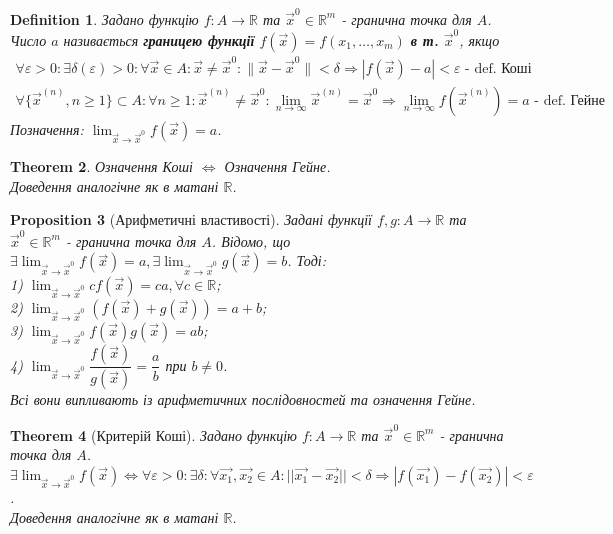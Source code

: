 \documentclass[a4paper, 10pt]{article}
\def\huge{\displaystyle}
\theoremstyle{theoremdd}
\newtheorem{theorem}{Theorem}[subsection]
\theoremstyle{theoremdd}
\newtheorem{definition}[theorem]{Definition}
\theoremstyle{theoremdd}
\theoremstyle{theoremdd}
\theoremstyle{theoremdd}
\newtheorem{proposition}[theorem]{Proposition}
\theoremstyle{theoremdd}
\theoremstyle{theoremdd}
\theoremstyle{theoremdd}
\newcommand\Norm[1]{\lVert#1\rVert}
\begin{document}
\begin{definition}
Задано функцію $f: A \to \mathbb{R}$ та $\vec{x}^0 \in \mathbb{R}^m$ - гранична точка для $A$.\\
Число $a$ називається \textbf{границею функції} $f(\vec{x}) = f(x_1,\dots,x_m)$ \textbf{в т.} $\vec{x}^0$, якщо
\begin{align*}
\forall \varepsilon > 0: \exists \delta(\varepsilon) > 0: \forall \vec{x} \in A: \vec{x} \neq \vec{x}^0: \Norm{\vec{x} - \vec{x}^0} < \delta \Rightarrow |f(\vec{x}) - a| < \varepsilon \textrm{ - def. Коші}\\
\forall \{\vec{x}^{(n)}, n \geq 1\} \subset A: \forall n \geq 1: \vec{x}^{(n)} \neq \vec{x}^0: \huge \lim_{n \to \infty} \vec{x}^{(n)} = \vec{x}^0 \Rightarrow \lim_{n \to \infty} f(\vec{x}^{(n)}) = a \textrm{ - def. Гейне}
\end{align*}
Позначення: $\huge \lim_{\vec{x} \to \vec{x}^0} f(\vec{x}) = a$.
\end{definition}

\begin{theorem}
Означення Коші $\iff$ Означення Гейне.\\
\textit{Доведення аналогічне як в матані $\mathbb{R}$.}
\end{theorem}

\begin{proposition}[Арифметичні властивості]
Задані функції $f,g: A \to \mathbb{R}$ та $\vec{x}^0 \in \mathbb{R}^m$ - гранична точка для $A$. Відомо, що \\ $\exists \huge \lim_{\vec{x} \to \vec{x}^0} f(\vec{x}) = a, \exists \lim_{\vec{x} \to \vec{x}^0} g(\vec{x}) = b$. Тоді:\\
1) $\huge \lim_{\vec{x} \to \vec{x}^0} cf(\vec{x}) = ca, \forall c \in \mathbb{R}$;\\
2) $\huge \lim_{\vec{x} \to \vec{x}^0} (f(\vec{x}) + g(\vec{x})) = a + b$;\\
3) $\huge \lim_{\vec{x} \to \vec{x}^0} f(\vec{x})g(\vec{x}) = ab$;\\
4) $\huge \lim_{\vec{x} \to \vec{x}^0} \dfrac{f(\vec{x})}{g(\vec{x})} = \dfrac{a}{b}$ при $b \neq 0$.\\
\textit{Всі вони випливають із арифметичних послідовностей та означення Гейне.}
\end{proposition}

\begin{theorem}[Критерій Коші]
Задано функцію $f: A \to \mathbb{R}$ та $\vec{x}^0 \in \mathbb{R}^m$ - гранична точка для $A$.\\
$\exists \huge \lim_{\vec{x} \to \vec{x}^0} f(\vec{x}) \iff \forall \varepsilon > 0: \exists \delta: \forall \vec{x_1}, \vec{x_2} \in A: ||\vec{x_1} - \vec{x_2} || < \delta \Rightarrow |f(\vec{x_1}) - f(\vec{x_2})| < \varepsilon$.\\
\textit{Доведення аналогічне як в матані $\mathbb{R}$.}
\end{theorem}
\end{document}
